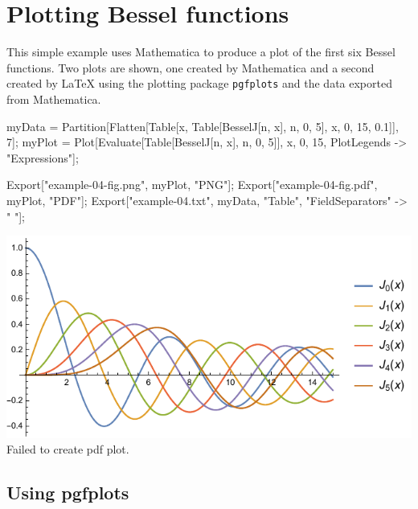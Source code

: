 \documentclass[12pt]{mmalatex}
\begin{document}
\section*{Plotting Bessel functions}

\vspace{-5pt}

This simple example uses Mathematica to produce a plot of the first six Bessel functions. Two plots are shown, one created by Mathematica and a second created by LaTeX using the plotting package {\tt\small pgfplots} and the data exported from Mathematica.

\begin{mathematica}
   myData = Partition[Flatten[Table[{x, Table[BesselJ[n, x], {n, 0, 5}]}, {x, 0, 15, 0.1}]], 7];
   myPlot = Plot[Evaluate[Table[BesselJ[n, x], {n, 0, 5}]], {x, 0, 15}, PlotLegends -> "Expressions"];

   Export["example-04-fig.png", myPlot, "PNG"];
   Export["example-04-fig.pdf", myPlot, "PDF"];
   Export["example-04.txt", myData, "Table",  "FieldSeparators" -> " "];
\end{mathematica}

\vfill

\begin{minipage}{\textwidth}
   \centering
   {\includegraphics[width=6.4in]{example-04-fig.pdf}}{Failed to create pdf plot.}
\end{minipage}

\vfill

\clearpage

\pgfplotsset{compat=newest}
\pgfplotsset{width=0.45\textwidth,height=0.34\textwidth}

\subsection*{Using pgfplots}
\end{document}
